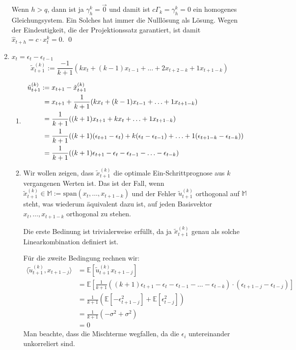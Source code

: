 \documentclass[a4paper,11pt,notitlepage,fullpage]{article}
\newcommand{\E}[1]{\mathbb E\left[#1\right]}
\begin{document}
\begin{enumerate}
Wenn $h>q$, dann ist ja $\gamma_h^k = \vec0$ und damit ist $c \Gamma_k = \gamma_h^k = 0$ ein homogenes Gleichungsystem. Ein Solches hat immer die Nulllösung als Lösung. Wegen der Eindeutigkeit, die der Projektionssatz garantiert, ist damit $\hat x_{t+h} = c \cdot x_t^k = 0$. \qed

\newpage
\item $x_t = \epsilon_t - \epsilon_{t-1}$
$$
\tilde x_{t+1}^{(k)} := \frac{-1}{k+1} (k x_t + (k-1)x_{t-1} + \ldots + 2 x_{t+2-k} + 1 x_{t+1-k})
$$
\begin{enumerate}
\item
\begin{align*}
\tilde u_{t+1}^{(k)} :\hspace{-0.3em}&= x_{t+1} - \tilde x_{t+1}^{(k)} \\
&= x_{t+1} + \frac{1}{k+1} (k x_t + (k-1)x_{t-1} + \ldots + 1 x_{t+1-k}) \\
&= \frac{1}{k+1} ((k+1) x_{t+1} + k x_t + \ldots + 1 x_{t+1-k}) \\
&= \frac{1}{k+1} ((k+1) (\epsilon_{t+1} - \epsilon_t) + k (\epsilon_t - \epsilon_{t-1}) + \ldots + 1 (\epsilon_{t+1-k} - \epsilon_{t-k})) \\
&= \frac{1}{k+1} ((k+1) \epsilon_{t+1} - \epsilon_t - \epsilon_{t-1} - \ldots - \epsilon_{t-k})
\end{align*}

\item Wir wollen zeigen, dass $\tilde x_{t+1}^{(k)}$ die optimale Ein-Schrittprognose aus $k$ vergangenen Werten ist. Das ist der Fall, wenn $\tilde x_{t+1}^{(k)} \in \mathbb M := \text{span}(x_t, \ldots, x_{t+1-k})$ und der Fehler $\tilde u_{t+1}^{(k)}$ orthogonal auf $\mathbb M$ steht, was wiederum äquivalent dazu ist, auf jeden Basisvektor $x_t, \ldots, x_{t+1-k}$ orthogonal zu stehen.

Die erste Bedinung ist trivialerweise erfüllt, da ja $\tilde x_{t+1}^{(k)}$ genau als solche Linearkombination definiert ist.

Für die zweite Bedingung rechnen wir:
\begin{align*}
\langle \tilde u_{t+1}^{(k)}, x_{t+1-j} \rangle &= \E{\tilde u_{t+1}^{(k)} x_{t+1-j}} \\
&= \E{\frac{1}{k+1} ((k+1) \epsilon_{t+1} - \epsilon_t - \epsilon_{t-1} - \ldots - \epsilon_{t-k}) \cdot (\epsilon_{t+1-j} - \epsilon_{t-j})} \\
&= \frac{1}{k+1} (\E{-\epsilon_{t+1-j}^2} + \E{\epsilon_{t-j}^2}) \\
&= \frac{1}{k+1} (-\sigma^2 + \sigma^2) \\
&= 0
\end{align*}
Man beachte, dass die Mischterme wegfallen, da die $\epsilon_i$ untereinander unkorreliert sind.


\end{enumerate}
\end{enumerate}
\end{document}
